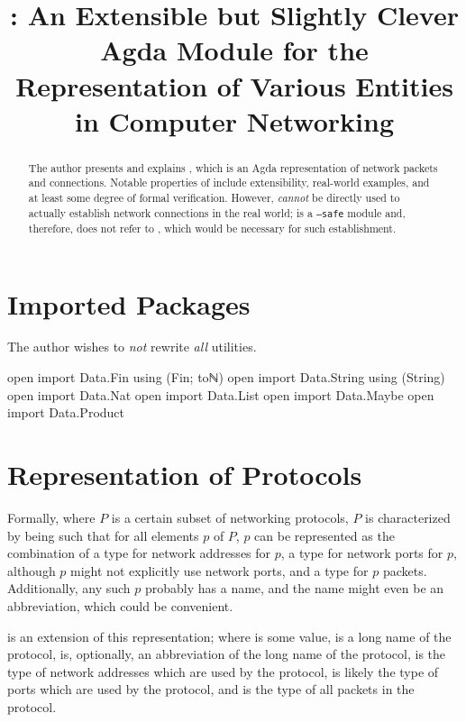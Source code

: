 \documentclass{report}
\title{\AgdaModule{Network}: An Extensible but Slightly Clever Agda Module for the Representation of Various Entities in Computer Networking}
\begin{document}
\maketitle{}

\begin{abstract}
The author presents and explains , which is an Agda representation of network packets and connections.  Notable properties of  include extensibility, real-world examples, and at least some degree of formal verification.  However,  \emph{cannot} be directly used to actually establish network connections in the real world;  is a \texttt{--safe} module and, therefore, does not refer to , which would be necessary for such establishment.
\end{abstract}

\chapter{Imported Packages}
The author wishes to \emph{not} rewrite \emph{all} utilities.

\begin{code}
open import Data.Fin using (Fin; toℕ)
open import Data.String using (String)
open import Data.Nat
open import Data.List
open import Data.Maybe
open import Data.Product
\end{code}

\chapter{Representation of Protocols}
Formally, where \(P\) is a certain subset of networking protocols, \(P\) is characterized by being such that for all elements \(p\) of \(P\), \(p\) can be represented as the combination of a type for network addresses for \(p\), a type for network ports for \(p\), although \(p\) might not explicitly use network ports, and a type for \(p\) packets.  Additionally, any such \(p\) probably has a name, and the name might even be an abbreviation, which could be convenient.

 is an extension of this representation; where  is some  value,   is a long name of the  protocol,   is, optionally, an abbreviation of the long name of the  protocol,   is the type of network addresses which are used by the  protocol,   is likely the type of ports which are used by the  protocol, and   is the type of all packets in the  protocol.
\end{document}
